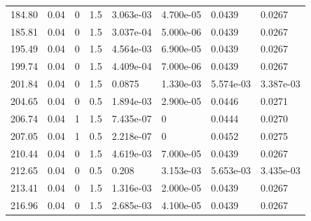 \documentclass[preview]{standalone}
\begin{document}
{{{\begin{tabular}{L{1.2cm}C{1.2cm} C{0.3cm}C{0.5cm} C{1.4cm}C{1.4cm} C{1.4cm}C{1.4cm}}
  184.80  &  0.04  & 0     & 1.5 &  3.063e-03  & 4.700e-05  & 0.0439 &  0.0267   \\ 
  185.81  &  0.04  & 0     & 1.5 &  3.037e-04  & 5.000e-06  & 0.0439 &  0.0267   \\ 
  195.49  &  0.04  & 0     & 1.5 &  4.564e-03  & 6.900e-05  & 0.0439 &  0.0267   \\ 
  199.74  &  0.04  & 0     & 1.5 &  4.409e-04  & 7.000e-06  & 0.0439 &  0.0267   \\ 
  201.84  &  0.04  & 0     & 1.5 &  0.0875  & 1.330e-03  & 5.574e-03 &  3.387e-03   \\ 
  204.65  &  0.04  & 0     & 0.5 &  1.894e-03  & 2.900e-05  & 0.0446 &  0.0271   \\ 
  206.74  &  0.04  & 1     & 1.5 &  7.435e-07  & 0  & 0.0444 &  0.0270   \\ 
  207.05  &  0.04  & 1     & 0.5 &  2.218e-07  & 0  & 0.0452 &  0.0275   \\ 
  210.44  &  0.04  & 0     & 1.5 &  4.619e-03  & 7.000e-05  & 0.0439 &  0.0267   \\ 
  212.65  &  0.04  & 0     & 0.5 &  0.208  & 3.153e-03  & 5.653e-03 &  3.435e-03   \\ 
  213.41  &  0.04  & 0     & 1.5 &  1.316e-03  & 2.000e-05  & 0.0439 &  0.0267   \\ 
  216.96  &  0.04  & 0     & 1.5 &  2.685e-03  & 4.100e-05  & 0.0439 &  0.0267   \\ 
\hline 
\end{tabular} 

}}}
\end{document}
